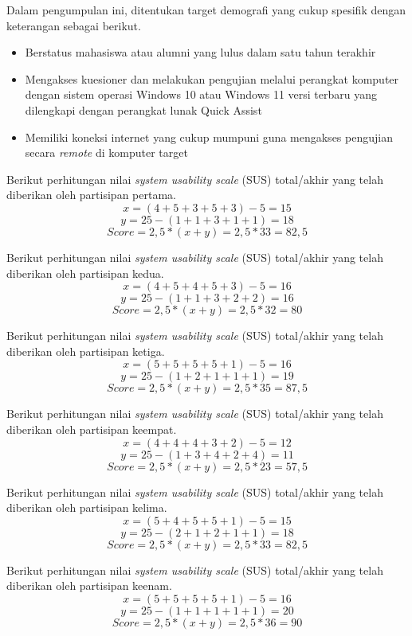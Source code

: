 Dalam pengumpulan ini, ditentukan target demografi yang cukup spesifik dengan keterangan sebagai berikut.
\begin{itemize}
    \item Berstatus mahasiswa atau alumni yang lulus dalam satu tahun terakhir
    \item Mengakses kuesioner dan melakukan pengujian melalui perangkat komputer dengan sistem operasi Windows 10 atau Windows 11 versi terbaru yang dilengkapi dengan perangkat lunak Quick Assist
    \item Memiliki koneksi internet yang cukup mumpuni guna mengakses pengujian secara \textit{remote} di komputer target
\end{itemize}

Berikut perhitungan nilai \textit{system usability scale} (SUS) total/akhir yang telah diberikan oleh partisipan pertama.
\[x = (4 + 5 + 3 + 5 + 3) - 5 = 15\]
\[y = 25 - (1 + 1 + 3 + 1 + 1) = 18\]
\[Score = 2,5 * (x + y) = 2,5 * 33 = 82,5\]

Berikut perhitungan nilai \textit{system usability scale} (SUS) total/akhir yang telah diberikan oleh partisipan kedua.
\[x = (4 + 5 + 4 + 5 + 3) - 5 = 16\]
\[y = 25 - (1 + 1 + 3 + 2 + 2) = 16\]
\[Score = 2,5 * (x + y) = 2,5 * 32 = 80\]

Berikut perhitungan nilai \textit{system usability scale} (SUS) total/akhir yang telah diberikan oleh partisipan ketiga.
\[x = (5 + 5 + 5 + 5 + 1) - 5 = 16\]
\[y = 25 - (1 + 2 + 1 + 1 + 1) = 19\]
\[Score = 2,5 * (x + y) = 2,5 * 35 = 87,5\]

Berikut perhitungan nilai \textit{system usability scale} (SUS) total/akhir yang telah diberikan oleh partisipan keempat.
\[x = (4 + 4 + 4 + 3 + 2) - 5 = 12\]
\[y = 25 - (1 + 3 + 4 + 2 + 4) = 11\]
\[Score = 2,5 * (x + y) = 2,5 * 23 = 57,5\]

Berikut perhitungan nilai \textit{system usability scale} (SUS) total/akhir yang telah diberikan oleh partisipan kelima.
\[x = (5 + 4 + 5 + 5 + 1) - 5 = 15\]
\[y = 25 - (2 + 1 + 2 + 1 + 1) = 18\]
\[Score = 2,5 * (x + y) = 2,5 * 33 = 82,5\]

Berikut perhitungan nilai \textit{system usability scale} (SUS) total/akhir yang telah diberikan oleh partisipan keenam.
\[x = (5 + 5 + 5 + 5 + 1) - 5 = 16\]
\[y = 25 - (1 + 1 + 1 + 1 + 1) = 20\]
\[Score = 2,5 * (x + y) = 2,5 * 36 = 90\]

